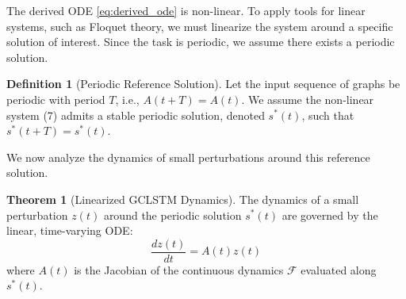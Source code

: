 \documentclass{article}
\theoremstyle{remark}
\theoremstyle{definition}
\newtheorem{definition}{Definition}
\newtheorem{theorem}{Theorem}[section]
\newcommand{\dpt}[1]{\frac{d#1}{dt}} %
\begin{document}
The derived ODE \ref{eq:derived_ode} is non-linear. To apply tools for linear systems, such as Floquet theory, we must linearize the system around a specific solution of interest. Since the task is periodic, we assume there exists a periodic solution.

\begin{definition}[Periodic Reference Solution]
Let the input sequence of graphs be periodic with period $T$, i.e., $A(t+T) = A(t)$. We assume the non-linear system (7) admits a stable periodic solution, denoted $s^*(t)$, such that $s^*(t+T) = s^*(t)$.
\end{definition}

We now analyze the dynamics of small perturbations around this reference solution.

\begin{theorem}[Linearized GCLSTM Dynamics]
The dynamics of a small perturbation $z(t)$ around the periodic solution $s^*(t)$ are governed by the linear, time-varying ODE:
\begin{equation}
    \dpt{z(t)} = A(t) z(t)
\end{equation}
where $A(t)$ is the Jacobian of the continuous dynamics $\mathcal{F}$ evaluated along $s^*(t)$.
\end{theorem}
\end{document}
